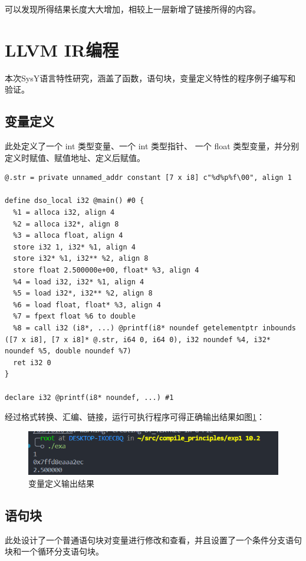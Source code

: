 \documentclass[UTF8,a4paper,10pt]{ctexart}
\begin{document}
可以发现所得结果长度大大增加，相较上一层新增了链接所得的内容。

\section{LLVM IR编程}
本次SysY语言特性研究，涵盖了函数，语句块，变量定义特性的程序例子编写和验证。

\subsection{变量定义}
此处定义了一个 int 类型变量、一个 int 类型指针、 一个 float 类型变量，并分别定义时赋值、赋值地址、定义后赋值。

\begin{verbatim}
@.str = private unnamed_addr constant [7 x i8] c"%d%p%f\00", align 1

define dso_local i32 @main() #0 {
  %1 = alloca i32, align 4
  %2 = alloca i32*, align 8
  %3 = alloca float, align 4
  store i32 1, i32* %1, align 4
  store i32* %1, i32** %2, align 8
  store float 2.500000e+00, float* %3, align 4
  %4 = load i32, i32* %1, align 4
  %5 = load i32*, i32** %2, align 8
  %6 = load float, float* %3, align 4
  %7 = fpext float %6 to double
  %8 = call i32 (i8*, ...) @printf(i8* noundef getelementptr inbounds ([7 x i8], [7 x i8]* @.str, i64 0, i64 0), i32 noundef %4, i32* noundef %5, double noundef %7)
  ret i32 0
}

declare i32 @printf(i8* noundef, ...) #1

\end{verbatim}

经过格式转换、汇编、链接，运行可执行程序可得正确输出结果如图\ref{pic:4}：
\begin{figure}[H]
  \centering
  \includegraphics[width=\textwidth]{figure/exa.png}
  \caption{变量定义输出结果}
  \label{pic:4}
\end{figure}

\subsection{语句块}
此处设计了一个普通语句块对变量进行修改和查看，并且设置了一个条件分支语句块和一个循环分支语句块。
\end{document}

